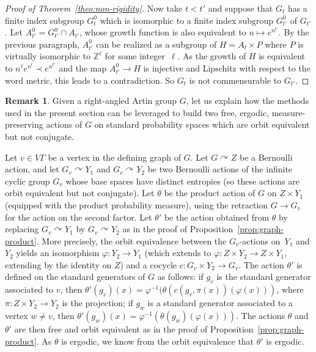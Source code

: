 \documentclass[11pt]{article}
\numberwithin{equation}{section}
\theoremstyle{plain}
\theoremstyle{definition}
\newtheorem{rk}[theo]{Remark}
\let\actson\curvearrowright
\begin{document}
\begin{proof}[Proof of Theorem~\ref{theo:non-rigidity}]
Now take $t<t'$ and suppose that $G_{t}$ has a finite index subgroup $G^0_t$ which is isomorphic to a finite index subgroup $G^0_{t'}$ of $G_{t'}$. Let $A^0_{t'}=G^0_{t'}\cap A_{t'}$, whose growth function is also equivalent to $n\mapsto e^{n^{t'}}$. By the previous paragraph, $A^0_{t'}$ can be realized as a subgroup of $H=A_t\times P$ where $P$ is virtually isomorphic to $\mathbb Z^\ell$ for some integer~$\ell$. As the growth of $H$ is equivalent to $n^\ell e^{n^{t}}\prec e^{n^{t'}}$ and the map $A^0_{t'}\to H$ is injective and Lipschitz with respect to the word metric, this leads to a contradiction. So $G_t$ is not commensurable to $G_{t'}$.
\end{proof}

\begin{rk}\label{rk:oe-non-conj}
Given a right-angled Artin group $G$, let us explain how the methods used in the present section can be leveraged to build two free, ergodic, measure-preserving actions of $G$ on standard probability spaces which are orbit equivalent but not conjugate.

Let $v\in V\Gamma$ be a vertex in the defining graph of $G$. Let $G\actson Z$ be a Bernoulli action, and let $G_v\actson Y_1$ and $G_v\actson Y_2$ be two Bernoulli actions of the infinite cyclic group $G_v$ whose base spaces have distinct entropies (so these actions are orbit equivalent but not conjugate). Let $\theta$ be the product action of $G$ on $Z\times Y_1$ (equipped with the product probability measure), using the retraction $G\to G_v$ for the action on the second factor. Let $\theta'$ be the action obtained from $\theta$ by replacing $G_v\actson Y_1$ by $G_v\actson Y_2$ as in the proof of Proposition~\ref{prop:graph-product}. More precisely, the orbit equivalence between the $G_v$-actions on~$Y_1$ and $Y_2$ yields an isomorphism $\varphi:Y_2\to Y_1$ (which extends to $\varphi:Z\times Y_2\to Z\times Y_1$, extending by the identity on $Z$) and a cocycle $c:G_v\times Y_2\to G_v$. The action $\theta'$ is defined on the standard generators of $G$ as follows: if $g_v$ is the standard generator associated to $v$, then $\theta'(g_v)(x)=\varphi^{-1}(\theta(c(g_v,\pi(x))(\varphi(x)))$, where $\pi:Z\times Y_2\to Y_2$ is the projection; if $g_w$ is a standard generator associated to a vertex $w\neq v$, then $\theta'(g_w)(x)=\varphi^{-1}(\theta(g_w)(\varphi(x)))$. The actions $\theta$ and $\theta'$ are then free and orbit equivalent as in the proof of Proposition~\ref{prop:graph-product}. As $\theta$ is ergodic, we know from the orbit equivalence that $\theta'$ is ergodic.


\end{rk}
\end{document}
